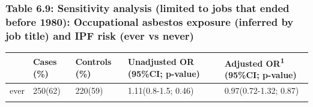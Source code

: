 \newpage

\hypertarget{table-6.9-sensitivity-analysis-limited-to-jobs-that-ended-before-1980-occupational-asbestos-exposure-inferred-by-job-title-and-ipf-risk-ever-vs-never}{%
\subsubsection{Table 6.9: Sensitivity analysis (limited to jobs that
ended before 1980): Occupational asbestos exposure (inferred by job
title) and IPF risk (ever vs
never)}\label{table-6.9-sensitivity-analysis-limited-to-jobs-that-ended-before-1980-occupational-asbestos-exposure-inferred-by-job-title-and-ipf-risk-ever-vs-never}}

\begin{longtable}[]{@{}lllll@{}}
\toprule
\begin{minipage}[b]{0.06\columnwidth}\raggedright
\strut
\end{minipage} & \begin{minipage}[b]{0.10\columnwidth}\raggedright
Cases (\%)\strut
\end{minipage} & \begin{minipage}[b]{0.12\columnwidth}\raggedright
Controls (\%)\strut
\end{minipage} & \begin{minipage}[b]{0.29\columnwidth}\raggedright
Unadjusted OR (95\%CI; p-value)\strut
\end{minipage} & \begin{minipage}[b]{0.28\columnwidth}\raggedright
Adjusted OR\textsuperscript{1} (95\%CI; p-value)\strut
\end{minipage}\tabularnewline
\midrule
\endhead
\begin{minipage}[t]{0.06\columnwidth}\raggedright
ever\strut
\end{minipage} & \begin{minipage}[t]{0.10\columnwidth}\raggedright
250(62)\strut
\end{minipage} & \begin{minipage}[t]{0.12\columnwidth}\raggedright
220(59)\strut
\end{minipage} & \begin{minipage}[t]{0.29\columnwidth}\raggedright
1.11(0.8-1.5; 0.46)\strut
\end{minipage} & \begin{minipage}[t]{0.28\columnwidth}\raggedright
0.97(0.72-1.32; 0.87)\strut
\end{minipage}\tabularnewline
\begin{minipage}[t]{0.06\columnwidth}\raggedright

\end{minipage}
\end{longtable}
